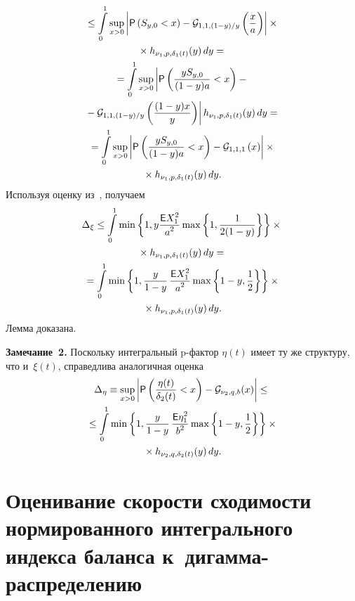 \begin{multicols}{2}
\noindent
\begin{multline*}
{}\le
\int\limits_0^1\sup\limits_{x>0}\left| 
{\sf P}\left(S_{y,0}<x\right)-
{\cal G}_{1,1,({1-y})/{y}}\left(\displaystyle\frac{\displaystyle x\mathstrut}{\displaystyle a\mathstrut}\right)
\right|\times{}\\
{}\times
h_{\nu_1,p,\delta_1 (t)}(y)\,dy
={}
\\
{}=\int\limits_0^1\sup\limits_{x>0}\left| {\sf P}\left(\displaystyle\frac{\displaystyle yS_{y,0}\mathstrut}{\displaystyle (1-y)a\mathstrut}<x\right)-{}\right.\\
\left.{}-
{\cal G}_{1,1,({1-y})/{y}}\left(\displaystyle\frac{\displaystyle (1-y)x\mathstrut}{\displaystyle y\mathstrut}\right)
\right|
h_{\nu_1,p,\delta_1 (t)}(y)\,dy
={}
\\
{}=
\int\limits_0^1\sup\limits_{x>0}\left|{\sf P}\left(\displaystyle\frac{\displaystyle yS_{y,0}\mathstrut}{\displaystyle (1-y)a\mathstrut}<x\right)-
{\cal G}_{1,1,1}\left(x\right)
\right|\times{}\\
{}\times
h_{\nu_1,p,\delta_1 (t)}(y)\,dy.
\end{multline*}
Используя оценку из~\cite{ShTs2021}, получаем
\begin{multline*}
\Delta_\xi\le
\int\limits_0^1
\min\left\{1, y \displaystyle\frac{\displaystyle {\sf E} X_1^2\mathstrut}{\displaystyle a^2\mathstrut}\max\left\{1,\displaystyle\frac{\displaystyle 1\mathstrut}{\displaystyle 2(1-y)\mathstrut}\right\}
\right\}\times{}\\
{}\times h_{\nu_1,p,\delta_1 (t)}(y)\,dy
={}
\\
{}=
\int\limits_0^1 \min\left\{1, \displaystyle\frac{\displaystyle y\mathstrut}{\displaystyle 1-y\mathstrut}\,\displaystyle\frac{\displaystyle {\sf E} X_1^2\mathstrut}{\displaystyle a^2\mathstrut}\max\left\{1-y,\displaystyle\frac{\displaystyle 1\mathstrut}{\displaystyle 2\mathstrut}\right\}
\right\}\times{}\\
{}\times
h_{\nu_1,p,\delta_1 (t)}(y)\,dy.
\end{multline*}
Лемма доказана.

\smallskip

\noindent
\textbf{Замечание~2.}
Поскольку интегральный p-фак\-тор $\eta(t)$ имеет ту же структуру, что и~$\xi(t)$, 
справедлива аналогичная оценка
\begin{multline*}
\Delta_\eta\equiv\sup\limits_{x>0}\left|{\sf P}\left( \displaystyle\frac{\displaystyle \eta(t)\mathstrut}{\displaystyle \delta_2 (t)\mathstrut}< 
x\right)-{\cal G}_{\nu_2,q,b}(x)\right|\le{}
\\
{}\le
\int\limits_0^1
\min\left\{1,
\displaystyle\frac{\displaystyle y\mathstrut}{\displaystyle 1-y\mathstrut}\,\displaystyle\frac{\displaystyle {\sf E} \eta_1^2\mathstrut}{\displaystyle b^2\mathstrut}\max\left\{1-y,\displaystyle\frac{\displaystyle 1\mathstrut}{\displaystyle 2\mathstrut}\right\}
\right\}\times{}\\
{}\times
h_{\nu_2,q,\delta_2 (t)}(y)\,dy.
\end{multline*}

\section{Оценивание скорости сходимости нормированного интегрального индекса 
баланса к~дигамма-распределению}


\end{multicols}
